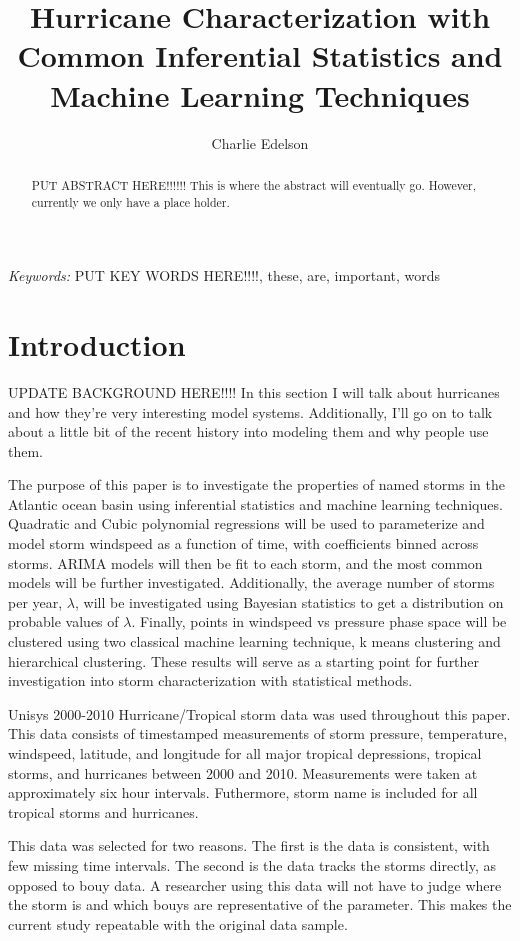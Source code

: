 \documentclass{article}
\title{Hurricane Characterization with Common Inferential Statistics and Machine Learning Techniques}
\author{Charlie Edelson}
\providecommand{\keywords}[1]{\small{\textit{Keywords:} #1}}
\begin{document}
	
	\maketitle

	\begin{abstract}
	PUT ABSTRACT HERE!!!!!! This is where the abstract will eventually go. However, currently we only have a place holder.
	\end{abstract}
	
	\keywords{PUT KEY WORDS HERE!!!!, these, are, important, words}

	\section{Introduction}
	UPDATE BACKGROUND HERE!!!! In this section I will talk about hurricanes and how they're very interesting model systems. Additionally, I'll go on to talk about a little bit of the recent history into modeling them and why people use them.
	
	The purpose of this paper is to investigate the properties of named storms in the Atlantic ocean basin using inferential 
statistics and machine learning techniques. Quadratic and Cubic polynomial regressions will be used to parameterize and model storm 
windspeed as a function of time, with coefficients binned across storms. ARIMA models will then be fit to each storm, and the most common 
models will be further investigated. Additionally, the average number of storms per year, $\lambda$, will be investigated using Bayesian 
statistics to get a distribution on probable values of $\lambda$. Finally, points in windspeed vs pressure phase space will be clustered 
using two classical machine learning technique, k means clustering and hierarchical clustering. These results will serve as a starting point for further investigation into storm characterization with statistical methods.

	Unisys 2000-2010 Hurricane/Tropical storm data was used throughout this paper\cite{Unisys}. This data consists of timestamped 
measurements of storm pressure, temperature, windspeed, latitude, and longitude for all major tropical depressions, tropical storms, and 
hurricanes between 2000 and 2010. Measurements were taken at approximately six hour intervals. Futhermore, storm name is included for all 
tropical storms and hurricanes.

	This data was selected for two reasons. The first is the data is consistent, with few missing time intervals. The second is the 
data tracks the storms directly, as opposed to bouy data. A researcher using this data will not have to judge where the storm is and which 
bouys are representative of the parameter. This makes the current study repeatable with the original data sample.
\end{document}
